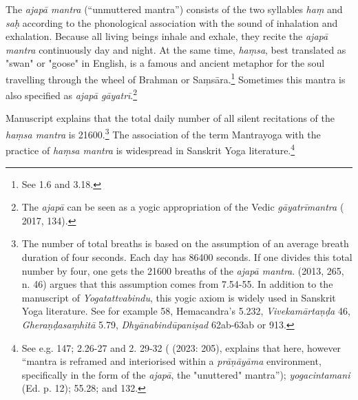 The \textit{ajapā mantra} (``unmuttered mantra'') consists of the two syllables \textit{haṃ} and \textit{saḥ} according to the phonological association with the sound of inhalation and exhalation. Because all living beings inhale and exhale, they recite the \textit{ajapā mantra} continuously day and night. At the same time, \textit{haṃsa}, best translated as "swan" or "goose" in English, is a famous and ancient metaphor for the soul travelling through the wheel of Brahman or Saṃsāra.\footnote{See  1.6 and 3.18.} Sometimes this mantra is also specified as \textit{ajapā gāyatrī}.\footnote{The \textit{ajapā} can be seen as a yogic appropriation of the Vedic \textit{gāyatrīmantra} ( 2017, 134).}  

Manuscript  explains that the total daily number of all silent recitations of the \textit{haṃsa mantra} is 21600.\footnote{The number of total breaths is based on the assumption of an average breath duration of four seconds. Each day has 86400 seconds. If one divides this total number by four, one gets the 21600 breaths of the \textit{ajapā mantra}. \citeauthor{birch2013} (2013, 265, n. 46) argues that this assumption comes from  7.54-55. In addition to the  manuscript of \textit{Yogatattvabindu}, this yogic axiom is widely used in Sanskrit Yoga literature. See for example \citeauthor{amaraughaprabodha} 58, Hemacandra's  5.232, \textit{Vivekamārtaṇḍa} 46, \textit{Gheraṇḍasaṃhitā} 5.79, \textit{Dhyānabindūpaniṣad} 62ab-63ab or  913.} The association of the term Mantrayoga with the practice of \textit{haṃsa mantra} is widespread in Sanskrit Yoga literature.\footnote{See e.g.  147;  2.26-27 and 2. 29-32 (\citeauthor{shivayogapradipikax} (2023: 205), explains that here, however ``mantra is reframed and interiorised within a \textit{prāṇāyāma} environment, specifically in the form of the \textit{ajapā}, the "unuttered" mantra''); \emph{yogacintamani} (Ed. p. 12);  55.28; and  132.}

